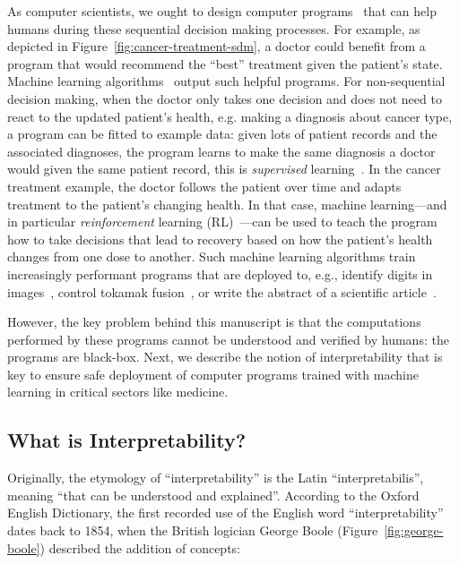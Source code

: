 As computer scientists, we ought to design computer programs~\cite{knuth63} that can help humans during these sequential decision making processes. 
For example, as depicted in Figure~\ref{fig:cancer-treatment-sdm}, a doctor could benefit from a program that would recommend the ``best'' treatment given the patient's state. 
Machine learning algorithms~\cite{turing} output such helpful programs.
For non-sequential decision making, when the doctor only takes one decision and does not need to react to the updated patient's health, e.g. making a diagnosis about cancer type, a program can be fitted to example data: given lots of patient records and the associated diagnoses, the program learns to make the same diagnosis a doctor would given the same patient record, this is \textit{supervised} learning~\cite{sl}. 
In the cancer treatment example, the doctor follows the patient over time and adapts treatment to the patient's changing health. In that case, machine learning—and in particular \textit{reinforcement} learning (RL)~\cite{sutton}—can be used to teach the program how to take decisions that lead to recovery based on how the patient's health changes from one dose to another.  
Such machine learning algorithms train increasingly performant programs that are deployed to, e.g., identify digits in images~\cite{lenet}, control tokamak fusion~\cite{tokamak}, or write the abstract of a scientific article~\cite{bert}.

However, the key problem behind this manuscript is that the computations performed by these programs cannot be understood and verified by humans: the programs are black-box.
Next, we describe the notion of interpretability that is key to ensure safe deployment of computer programs trained with machine learning in critical sectors like medicine.

\subsection{What is Interpretability?}


Originally, the etymology of ``interpretability'' is the Latin ``interpretabilis'', meaning ``that can be understood and explained''.
According to the Oxford English Dictionary, the first recorded use of the English word ``interpretability'' dates back to 1854, when the British logician George Boole (Figure~\ref{fig:george-boole}) described the addition of concepts:

